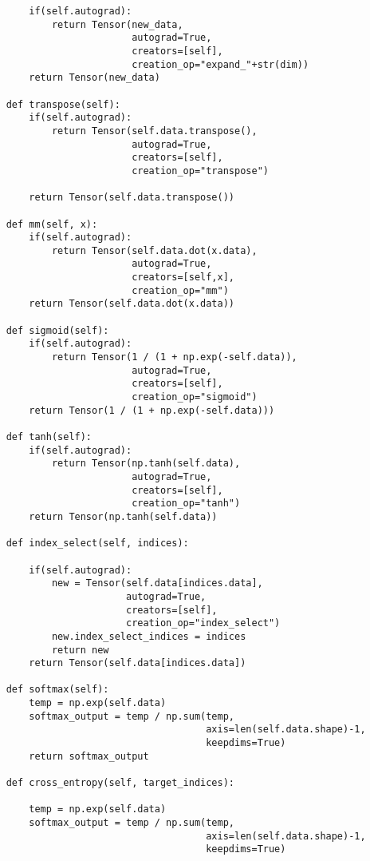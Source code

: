 \documentclass[12pt]{article}
\begin{document}
\begin{verbatim}
        if(self.autograd):
            return Tensor(new_data,
                          autograd=True,
                          creators=[self],
                          creation_op="expand_"+str(dim))
        return Tensor(new_data)
    
    def transpose(self):
        if(self.autograd):
            return Tensor(self.data.transpose(),
                          autograd=True,
                          creators=[self],
                          creation_op="transpose")
        
        return Tensor(self.data.transpose())
    
    def mm(self, x):
        if(self.autograd):
            return Tensor(self.data.dot(x.data),
                          autograd=True,
                          creators=[self,x],
                          creation_op="mm")
        return Tensor(self.data.dot(x.data))
    
    def sigmoid(self):
        if(self.autograd):
            return Tensor(1 / (1 + np.exp(-self.data)),
                          autograd=True,
                          creators=[self],
                          creation_op="sigmoid")
        return Tensor(1 / (1 + np.exp(-self.data)))

    def tanh(self):
        if(self.autograd):
            return Tensor(np.tanh(self.data),
                          autograd=True,
                          creators=[self],
                          creation_op="tanh")
        return Tensor(np.tanh(self.data))
    
    def index_select(self, indices):

        if(self.autograd):
            new = Tensor(self.data[indices.data],
                         autograd=True,
                         creators=[self],
                         creation_op="index_select")
            new.index_select_indices = indices
            return new
        return Tensor(self.data[indices.data])
    
    def softmax(self):
        temp = np.exp(self.data)
        softmax_output = temp / np.sum(temp,
                                       axis=len(self.data.shape)-1,
                                       keepdims=True)
        return softmax_output
    
    def cross_entropy(self, target_indices):

        temp = np.exp(self.data)
        softmax_output = temp / np.sum(temp,
                                       axis=len(self.data.shape)-1,
                                       keepdims=True)
        

\end{verbatim}
\end{document}
